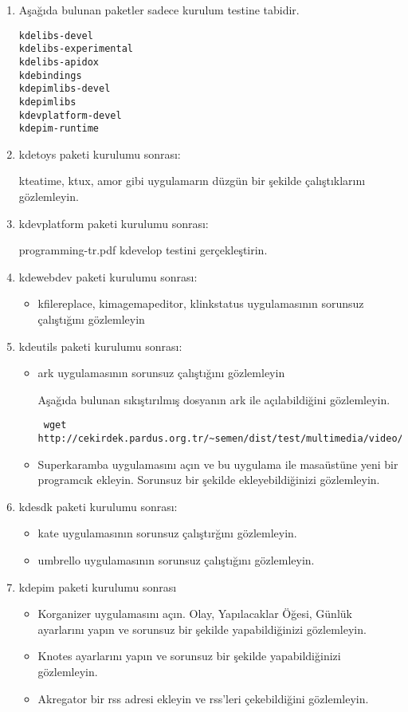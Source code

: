 \documentclass[a4paper,10pt]{article}
\begin{document}
\begin{enumerate} 
\item  Aşağıda bulunan paketler sadece kurulum testine tabidir.
\begin{verbatim}
kdelibs-devel
kdelibs-experimental
kdelibs-apidox 
kdebindings
kdepimlibs-devel
kdepimlibs
kdevplatform-devel
kdepim-runtime
\end{verbatim}
\item kdetoys paketi kurulumu sonrası:

kteatime, ktux, amor gibi uygulamarın düzgün bir şekilde çalıştıklarını gözlemleyin.
\item kdevplatform paketi kurulumu sonrası:

programming-tr.pdf  kdevelop testini gerçekleştirin.

\item kdewebdev paketi kurulumu sonrası:
\begin{itemize}
 \item kfilereplace, kimagemapeditor, klinkstatus uygulamasının sorunsuz çalıştığını gözlemleyin
\end{itemize}

\item kdeutils paketi kurulumu sonrası:

\begin{itemize}
 \item ark uygulamasının sorunsuz çalıştığını gözlemleyin

Aşağıda bulunan sıkıştırılmış dosyanın ark ile açılabildiğini gözlemleyin.
\begin{verbatim}
 wget http://cekirdek.pardus.org.tr/~semen/dist/test/multimedia/video/cokluortam.tar
\end{verbatim}

 \item Superkaramba uygulamasını açın ve bu uygulama ile masaüstüne yeni bir programcık ekleyin. Sorunsuz bir şekilde ekleyebildiğinizi gözlemleyin.
\end{itemize}

\item kdesdk paketi kurulumu sonrası:
\begin{itemize}
 \item kate uygulamasının sorunsuz çalıştırğını gözlemleyin.
 \item umbrello uygulamasının sorunsuz çalıştığını gözlemleyin.
\end{itemize}

\item kdepim paketi kurulumu sonrası
\begin{itemize}
 \item Korganizer uygulamasını açın. Olay, Yapılacaklar Öğesi, Günlük ayarlarını yapın ve sorunsuz bir şekilde yapabildiğinizi gözlemleyin.
 \item Knotes ayarlarını yapın ve sorunsuz bir şekilde yapabildiğinizi gözlemleyin.
 \item Akregator bir rss adresi ekleyin ve rss'leri çekebildiğini gözlemleyin.
\end{itemize}


\end{enumerate}
\end{document}
